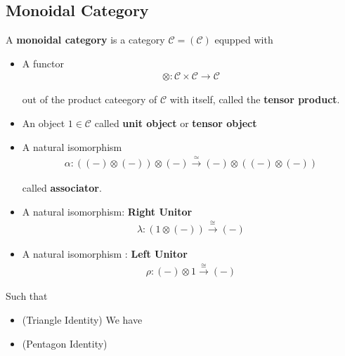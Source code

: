 \documentclass[Total.tex]{subfiles}
\begin{document}
			\subsection{Monoidal Category}
				\begin{Def}
					A \textbf{monoidal category} is a category $\mathcal{C}=(\mathcal{C})$ equpped with
					\begin{itemize}
						\item A functor
						\begin{gather*}
							\otimes: \mathcal{C}\times \mathcal{C}\rightarrow \mathcal{C}
						\end{gather*}
						
						out of the product cateegory of $\mathcal{C}$ with itself, called the \textbf{tensor product}.
						\item An object $1\in \mathcal{C}$ called \textbf{unit object} or \textbf{tensor object}
						\item A natural isomorphism
						\begin{gather*}
							\alpha:((-)\otimes (-))\otimes (-)\stackrel{\simeq}{\rightarrow} (-)\otimes ((-)\otimes (-))
						\end{gather*}
						
						called \textbf{associator}.
						\item A natural isomorphism: \textbf{Right Unitor}
						\begin{gather*}
							\lambda:(1\otimes(-))\stackrel{\cong}{\rightarrow}(-)
						\end{gather*}
						\item A natural isomorphism : \textbf{Left Unitor}
						\begin{gather*}
							\rho:(-)\otimes 1\stackrel{\cong}{\rightarrow} (-)
						\end{gather*}
					\end{itemize}
					
					Such that
					\begin{itemize}
						\item (Triangle Identity) We have 
						\begin{center}
						\end{center}
						\item (Pentagon Identity)
						\begin{center}
						\end{center}
					\end{itemize}
				\end{Def}
				
\end{document}
